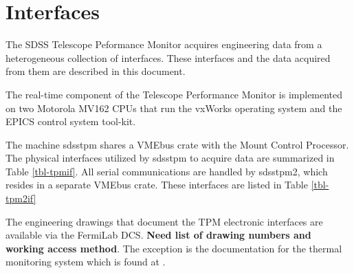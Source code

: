 \section{Interfaces}

The SDSS Telescope Peformance Monitor acquires engineering data 
from a heterogeneous collection of interfaces. These interfaces 
and the data acquired from them are described in this document.

The real-time component of the Telescope Performance Monitor is 
implemented on two Motorola MV162 CPUs that run the vxWorks 
operating system and the EPICS control system tool-kit.

The machine sdsstpm shares a VMEbus crate with the Mount 
Control Processor. The physical interfaces utilized by sdsstpm 
to acquire data are summarized in Table \ref{tbl-tpmif}.
All serial communications are handled by sdsstpm2, which resides 
in a separate VMEbus crate. These interfaces are listed in
Table \ref{tbl-tpm2if}

The engineering drawings that document the TPM electronic
interfaces are available via the FermiLab DCS. 
{\bf Need list of drawing numbers and working access method}. 
The exception is the
documentation for the thermal monitoring
system which is found at
.

